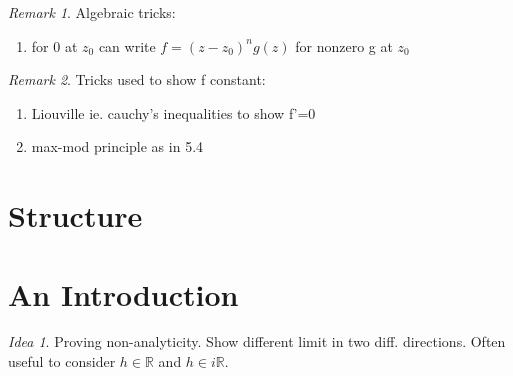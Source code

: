 \documentclass[11pt]{article}
\newcommand{\R}{\mathbb{R}}
\theoremstyle{remark}
\newtheorem{remark}{Remark}
\newtheorem{idea}{Idea}
\begin{document}
\begin{remark}
	Algebraic tricks:
	\begin{enumerate}
		\item for 0 at $z_0$ can write $f = (z-z_0)^n g(z)$ for nonzero g at $z_0$
	\end{enumerate}
\end{remark}

\begin{remark}
	Tricks used to show f constant:
	\begin{enumerate}
		\item Liouville ie. cauchy's inequalities to show f'=0
		\item max-mod principle as in 5.4
	\end{enumerate}
\end{remark}

\section{Structure}

\section{An Introduction}

\begin{idea}
	Proving non-analyticity. Show different limit in two diff. directions. Often useful to consider $h \in \R$ and $h \in i \R$. 
\end{idea}
\end{document}

